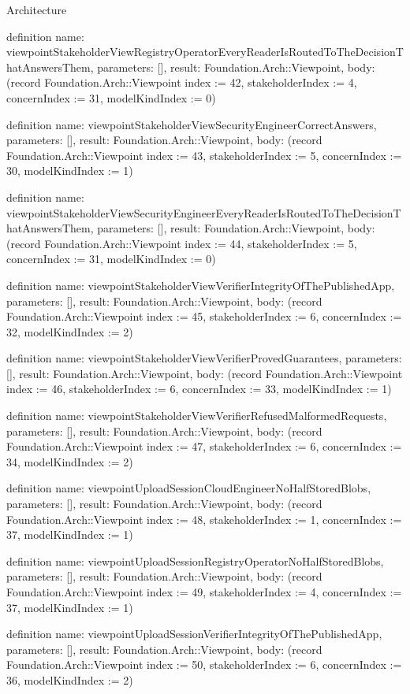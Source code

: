 \begin{lexlean}{Architecture}
\begin{semanticmodule}
definition{
  name: viewpointStakeholderViewRegistryOperatorEveryReaderIsRoutedToTheDecisionThatAnswersThem,
  parameters: [],
  result: Foundation.Arch::Viewpoint,
  body: (record Foundation.Arch::Viewpoint {index := 42, stakeholderIndex := 4, concernIndex := 31, modelKindIndex := 0})
}

definition{
  name: viewpointStakeholderViewSecurityEngineerCorrectAnswers,
  parameters: [],
  result: Foundation.Arch::Viewpoint,
  body: (record Foundation.Arch::Viewpoint {index := 43, stakeholderIndex := 5, concernIndex := 30, modelKindIndex := 1})
}

definition{
  name: viewpointStakeholderViewSecurityEngineerEveryReaderIsRoutedToTheDecisionThatAnswersThem,
  parameters: [],
  result: Foundation.Arch::Viewpoint,
  body: (record Foundation.Arch::Viewpoint {index := 44, stakeholderIndex := 5, concernIndex := 31, modelKindIndex := 0})
}

definition{
  name: viewpointStakeholderViewVerifierIntegrityOfThePublishedApp,
  parameters: [],
  result: Foundation.Arch::Viewpoint,
  body: (record Foundation.Arch::Viewpoint {index := 45, stakeholderIndex := 6, concernIndex := 32, modelKindIndex := 2})
}

definition{
  name: viewpointStakeholderViewVerifierProvedGuarantees,
  parameters: [],
  result: Foundation.Arch::Viewpoint,
  body: (record Foundation.Arch::Viewpoint {index := 46, stakeholderIndex := 6, concernIndex := 33, modelKindIndex := 1})
}

definition{
  name: viewpointStakeholderViewVerifierRefusedMalformedRequests,
  parameters: [],
  result: Foundation.Arch::Viewpoint,
  body: (record Foundation.Arch::Viewpoint {index := 47, stakeholderIndex := 6, concernIndex := 34, modelKindIndex := 2})
}

definition{
  name: viewpointUploadSessionCloudEngineerNoHalfStoredBlobs,
  parameters: [],
  result: Foundation.Arch::Viewpoint,
  body: (record Foundation.Arch::Viewpoint {index := 48, stakeholderIndex := 1, concernIndex := 37, modelKindIndex := 1})
}

definition{
  name: viewpointUploadSessionRegistryOperatorNoHalfStoredBlobs,
  parameters: [],
  result: Foundation.Arch::Viewpoint,
  body: (record Foundation.Arch::Viewpoint {index := 49, stakeholderIndex := 4, concernIndex := 37, modelKindIndex := 1})
}

definition{
  name: viewpointUploadSessionVerifierIntegrityOfThePublishedApp,
  parameters: [],
  result: Foundation.Arch::Viewpoint,
  body: (record Foundation.Arch::Viewpoint {index := 50, stakeholderIndex := 6, concernIndex := 36, modelKindIndex := 2})
}


\end{semanticmodule}
\end{lexlean}
